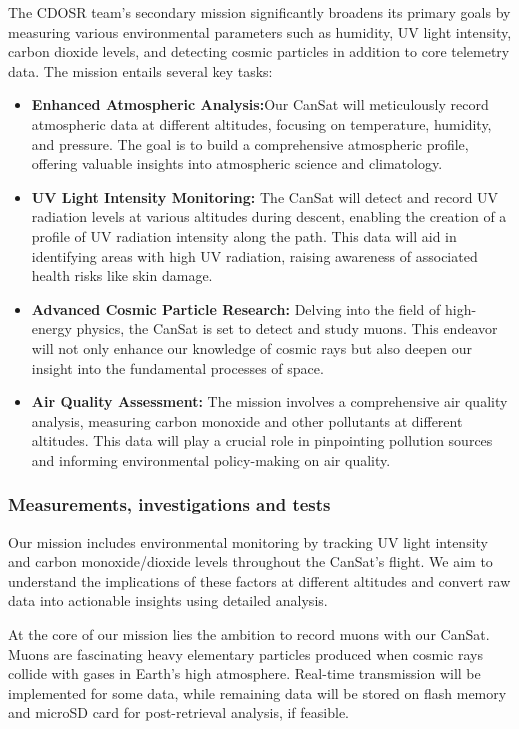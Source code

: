 The CDOSR team's secondary mission significantly broadens its primary goals by measuring various environmental parameters such as humidity, UV light intensity, carbon dioxide levels, and detecting cosmic particles in addition to core telemetry data. The mission entails several key tasks:
\begin{itemize}[leftmargin=1.27cm, itemindent=0cm, topsep=2pt, label=\faTasks]
    \item {\textbf{Enhanced Atmospheric Analysis:}}Our CanSat will meticulously record atmospheric data at different altitudes, focusing on temperature, humidity, and pressure. The goal is to build a comprehensive atmospheric profile, offering valuable insights into atmospheric science and climatology.
    \item {\textbf{UV Light Intensity Monitoring:}} The CanSat will detect and record UV radiation levels at various altitudes during descent, enabling the creation of a profile of UV radiation intensity along the path. This data will aid in identifying areas with high UV radiation, raising awareness of associated health risks like skin damage.

    \item {\textbf{Advanced Cosmic Particle Research:}} Delving into the field of high-energy physics, the CanSat is set to detect and study muons. This endeavor will not only enhance our knowledge of cosmic rays but also deepen our insight into the fundamental processes of space.
    \item {\textbf{Air Quality Assessment:}} The mission involves a comprehensive air quality analysis, measuring carbon monoxide and other pollutants at different altitudes. This data will play a crucial role in pinpointing pollution sources and informing environmental policy-making on air quality.
\end{itemize}
\subsubsection{Measurements, investigations and tests}


Our mission includes environmental monitoring by tracking UV light intensity and carbon monoxide/dioxide levels throughout the CanSat's flight. We aim to understand the implications of these factors at different altitudes and convert raw data into actionable insights using detailed analysis.

At the core of our mission lies the ambition to record muons with our CanSat. Muons are fascinating heavy elementary particles produced when cosmic rays collide with gases in Earth's high atmosphere. Real-time transmission will be implemented for some data, while remaining data will be stored on flash memory and microSD card for post-retrieval analysis, if feasible.

